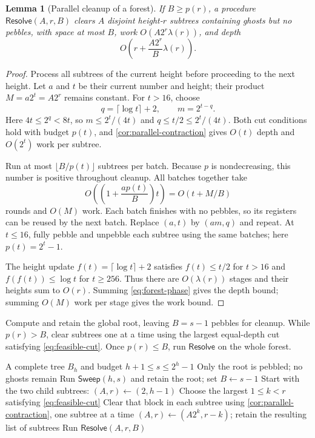\documentclass[11pt]{article}
\newtheorem{lemma}[lemma]{Lemma}
\theoremstyle{definition}
\theoremstyle{remark}
\newcommand{\Sweep}{\mathsf{Sweep}}
\newcommand{\Resolve}{\mathsf{Resolve}}
\begin{document}
\begin{lemma}[Parallel cleanup of a forest]
\label{lem:resolver}
If $B\ge p(r)$, a procedure $\Resolve(A,r,B)$ clears $A$ disjoint height-$r$ subtrees containing ghosts but no pebbles, with space at most $B$, work $O(A2^r\lambda(r))$, and depth
\begin{equation}
O\!\left(r+\frac{A2^r}{B}\lambda(r)\right).
\label{eq:forest-cleanup}
\end{equation}
\end{lemma}
\begin{proof}
Process all subtrees of the current height before proceeding to the next height. Let $a$ and $t$ be their current number and height; their product $M=a2^t=A2^r$ remains constant. For $t>16$, choose
\begin{equation}
q=\lceil\log t\rceil+2, \qquad m=2^{t-q}.
\label{eq:resolver-cut}
\end{equation}
Here $4t\le2^q<8t$, so $m\le2^t/(4t)$ and $q\le t/2\le2^t/(4t)$. Both cut conditions hold with budget $p(t)$, and \cref{cor:parallel-contraction} gives $O(t)$ depth and $O(2^t)$ work per subtree.

Run at most $\lfloor B/p(t)\rfloor$ subtrees per batch. Because $p$ is nondecreasing, this number is positive throughout cleanup. All batches together take
\begin{equation}
O\!\left(\left(1+\frac{ap(t)}B\right)t\right)=O(t+M/B)
\label{eq:forest-phase}
\end{equation}
rounds and $O(M)$ work. Each batch finishes with no pebbles, so its registers can be reused by the next batch. Replace $(a,t)$ by $(am,q)$ and repeat. At $t\le16$, fully pebble and unpebble each subtree using the same batches; here $p(t)=2^t-1$.

The height update $f(t)=\lceil\log t\rceil+2$ satisfies $f(t)\le t/2$ for $t>16$ and $f(f(t))\le\log t$ for $t\ge256$. Thus there are $O(\lambda(r))$ stages and their heights sum to $O(r)$. Summing \cref{eq:forest-phase} gives the depth bound; summing $O(M)$ work per stage gives the work bound.
\end{proof}

Compute and retain the global root, leaving $B=s-1$ pebbles for cleanup. While $p(r)>B$, clear subtrees one at a time using the largest equal-depth cut satisfying \cref{eq:feasible-cut}. Once $p(r)\le B$, run $\Resolve$ on the whole forest.

\begin{algorithm}[H]
\caption{Parallel block cleanup on complete trees}
\label{alg:parallel-tree}
\begin{algorithmic}[1]
\Require A complete tree $B_h$ and budget $h+1\le s\le2^h-1$
\Ensure Only the root is pebbled; no ghosts remain
\State Run $\Sweep(h,s)$ and retain the root; set $B\gets s-1$
\State Start with the two child subtrees: $(A,r)\gets(2,h-1)$
 \State Choose the largest $1\le k<r$ satisfying \cref{eq:feasible-cut}
 \State Clear that block in each subtree using \cref{cor:parallel-contraction}, one subtree at a time
 \State $(A,r)\gets(A2^k,r-k)$; retain the resulting list of subtrees
\EndWhile
\State Run $\Resolve(A,r,B)$
\end{algorithmic}
\end{algorithm}
\end{document}
